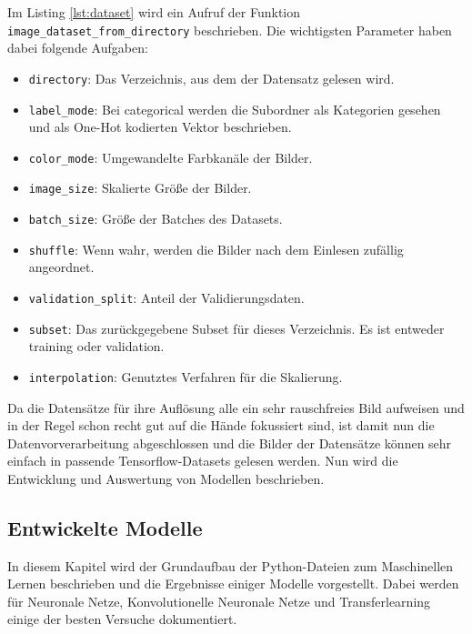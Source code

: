 \documentclass[11pt,bibliography=totocnumbered]{scrartcl}
\begin{document}
Im Listing \ref{lst:dataset} wird ein Aufruf der Funktion \lstinline[language=pythoninline]|image_dataset_from_directory| beschrieben. Die wichtigsten Parameter haben dabei folgende Aufgaben:
\begin{itemize}
	\item \lstinline[language=pythoninline]|directory|: Das Verzeichnis, aus dem der Datensatz gelesen wird.
	\item \lstinline[language=pythoninline]|label_mode|: Bei categorical werden die Subordner als Kategorien gesehen und als One-Hot kodierten Vektor beschrieben.
	\item \lstinline[language=pythoninline]|color_mode|: Umgewandelte Farbkanäle der Bilder.
	\item \lstinline[language=pythoninline]|image_size|: Skalierte Größe der Bilder.
	\item \lstinline[language=pythoninline]|batch_size|: Größe der Batches des Datasets.
	\item \lstinline[language=pythoninline]|shuffle|: Wenn wahr, werden die Bilder nach dem Einlesen zufällig angeordnet.
	\item \lstinline[language=pythoninline]|validation_split|: Anteil der Validierungsdaten.
	\item \lstinline[language=pythoninline]|subset|: Das zurückgegebene Subset für dieses Verzeichnis. Es ist entweder training oder validation.
	\item \lstinline[language=pythoninline]|interpolation|: Genutztes Verfahren für die Skalierung.
\end{itemize}
Da die Datensätze für ihre Auflösung alle ein sehr rauschfreies Bild aufweisen und in der Regel schon recht gut auf die Hände fokussiert sind, ist damit nun die Datenvorverarbeitung abgeschlossen und die Bilder der Datensätze können sehr einfach in passende Tensorflow-Datasets gelesen werden. Nun wird die Entwicklung und Auswertung von Modellen beschrieben.
\subsection{Entwickelte Modelle}
In diesem Kapitel wird der Grundaufbau der Python-Dateien zum Maschinellen Lernen beschrieben und die Ergebnisse einiger Modelle vorgestellt. Dabei werden für Neuronale Netze, Konvolutionelle Neuronale Netze und Transferlearning einige der besten Versuche dokumentiert. 
\end{document}
